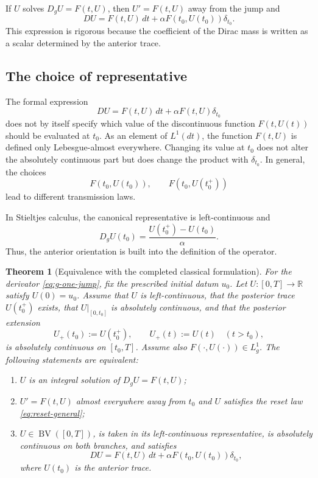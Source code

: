 \documentclass[preprint,12pt]{elsarticle}
\newcommand{\newrev}[1]{{\color{red}#1}}
\newcommand{\finalrev}[1]{{\color{red}#1}}
\newenvironment{finalrevision}{\begingroup\color{red}}{\endgroup}
\newcommand{\newrev}[1]{#1}
\newcommand{\finalrev}[1]{#1}
\newenvironment{finalrevision}{}{}
\newtheorem{theorem}{Theorem}[section]
\theoremstyle{definition}
\theoremstyle{remark}
\newcommand{\R}{\mathbb R}
\newcommand{\BV}{\operatorname{BV}}
\begin{document}
If $U$ solves $D_gU=F(t,U)$, then $U'=F(t,U)$ away from the jump and
\begin{equation}\label{eq:classical-with-trace}
 DU=F(t,U)\,dt+\alpha F(t_0,U(t_0))\delta_{t_0}.
\end{equation}
This expression is rigorous because the coefficient of the Dirac mass is written as a scalar determined by the anterior trace.

\subsection{The choice of representative}

The formal expression
\[
 DU=F(t,U)\,dt+\alpha F(t,U)\delta_{t_0}
\]
does not by itself specify which value of the discontinuous function $F(t,U(t))$ should be evaluated at $t_0$. As an element of $L^1(dt)$, the function $F(t,U)$ is defined only Lebesgue-almost everywhere. Changing its value at $t_0$ does not alter the absolutely continuous part but does change the product with $\delta_{t_0}$. In general, the choices
\[
 F(t_0,U(t_0)),\qquad F(t_0,U(t_0^+))
\]
lead to different transmission laws.

In Stieltjes calculus, the canonical representative is left-continuous and
\[
 D_gU(t_0)=\frac{U(t_0^+)-U(t_0)}{\alpha}.
\]
Thus, the anterior orientation is built into the definition of the operator.

\begin{theorem}[Equivalence with the completed classical formulation]\label{thm:classical-equivalence}
For the derivator \eqref{eq:g-one-jump}, fix the prescribed initial datum
\(u_0\). \newrev{Let \(U:[0,T]\to\R\) satisfy \(U(0)=u_0\).}
\begin{finalrevision}
Assume that \(U\) is left-continuous, that the posterior trace
\(U(t_0^+)\) exists, that \(U|_{[0,t_0]}\) is absolutely continuous, and
that the posterior extension
\[
 U_+(t_0):=U(t_0^+),\qquad U_+(t):=U(t)\quad(t>t_0),
\]
is absolutely continuous on \([t_0,T]\). Assume also
\(F(\cdot,U(\cdot))\in L_g^1\).
\end{finalrevision}
The following statements are equivalent:
\begin{enumerate}[label=\roman*)]
 \item $U$ is an integral solution of $D_gU=F(t,U)$;
 \item \finalrev{$U'=F(t,U)$ almost everywhere away from $t_0$ and $U$ satisfies the reset law \eqref{eq:reset-general};}
 \item $U\in\BV([0,T])$, is taken in its left-continuous representative, is absolutely continuous on both branches, and satisfies
 \begin{equation}\label{eq:classical-completed}
 DU=F(t,U)\,dt+\alpha F(t_0,U(t_0))\delta_{t_0},
 \end{equation}
 where $U(t_0)$ is the anterior trace.
\end{enumerate}
\end{theorem}
\end{document}
